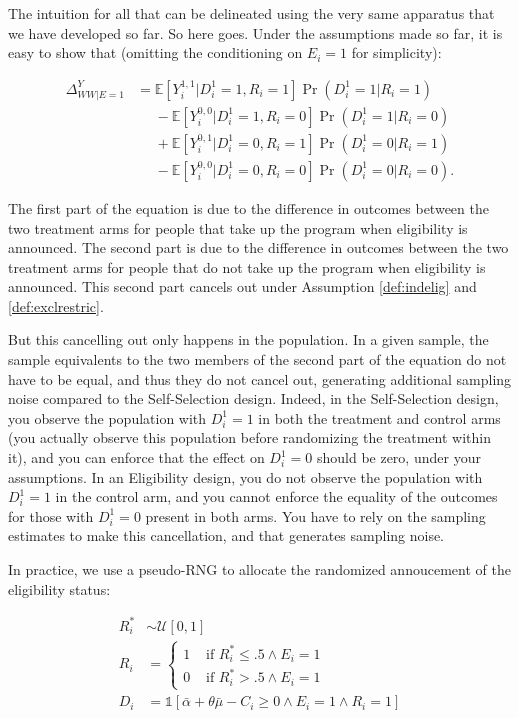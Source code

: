 \documentclass[]{book}
\newcommand{\uns}[1]{\mathds{1}[ #1 ]}
\newcommand{\esp}[1]{\mathbb{E}[ #1 ]}
\theoremstyle{definition}
\theoremstyle{definition}
\theoremstyle{definition}
\theoremstyle{remark}
\let\BeginKnitrBlock\begin \let\EndKnitrBlock\end
\begin{document}
The intuition for all that can be delineated using the very same apparatus that we have developed so far.
So here goes.
Under the assumptions made so far, it is easy to show that (omitting the conditioning on \(E_i=1\) for simplicity):

\begin{align*}
  \Delta^Y_{WW|E=1} & = \esp{Y_i^{1,1}|D_i^1=1,R_i=1}\Pr(D^1_i=1|R_i=1)\\
                    & \phantom{=}-\esp{Y_i^{0,0}|D_i^1=1,R_i=0}\Pr(D^1_i=1|R_i=0) \\
                    & \phantom{=}+ \esp{Y_i^{0,1}|D_i^1=0,R_i=1}\Pr(D^1_i=0|R_i=1)\\
                    & \phantom{=}-\esp{Y_i^{0,0}|D_i^1=0,R_i=0}\Pr(D^1_i=0|R_i=0).  
\end{align*}

The first part of the equation is due to the difference in outcomes between the two treatment arms for people that take up the program when eligibility is announced.
The second part is due to the difference in outcomes between the two treatment arms for people that do not take up the program when eligibility is announced.
This second part cancels out under Assumption \ref{def:indelig} and \ref{def:exclrestric}.

But this cancelling out only happens in the population.
In a given sample, the sample equivalents to the two members of the second part of the equation do not have to be equal, and thus they do not cancel out, generating additional sampling noise compared to the Self-Selection design.
Indeed, in the Self-Selection design, you observe the population with \(D_i^1=1\) in both the treatment and control arms (you actually observe this population before randomizing the treatment within it), and you can enforce that the effect on \(D_i^1=0\) should be zero, under your assumptions.
In an Eligibility design, you do not observe the population with \(D_i^1=1\) in the control arm, and you cannot enforce the equality of the outcomes for those with \(D_i^1=0\) present in both arms.
You have to rely on the sampling estimates to make this cancellation, and that generates sampling noise.

\BeginKnitrBlock{remark}
\iffalse{} {Remark. } \fi{}In practice, we use a pseudo-RNG to allocate the randomized annoucement of the eligibility status:
\EndKnitrBlock{remark}

\begin{align*}
  R_i^* & \sim \mathcal{U}[0,1]\\
  R_i & = 
  \begin{cases}
    1 & \text{ if } R_i^*\leq .5 \land E_i=1\\
    0 & \text{ if } R_i^*> .5 \land E_i=1
  \end{cases} \\
  D_i & = \uns{\bar{\alpha}+\theta\bar{\mu}-C_i\geq0 \land E_i=1 \land R_i=1}
\end{align*}
\end{document}
